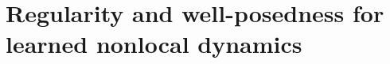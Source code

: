 \documentclass[11pt,a4paper]{article}
\theoremstyle{plain}
\theoremstyle{definition}
\theoremstyle{remark}
\begin{document}



\section{Regularity and well-posedness for learned nonlocal dynamics}
\label{sec:network_regularity}
\end{document}
